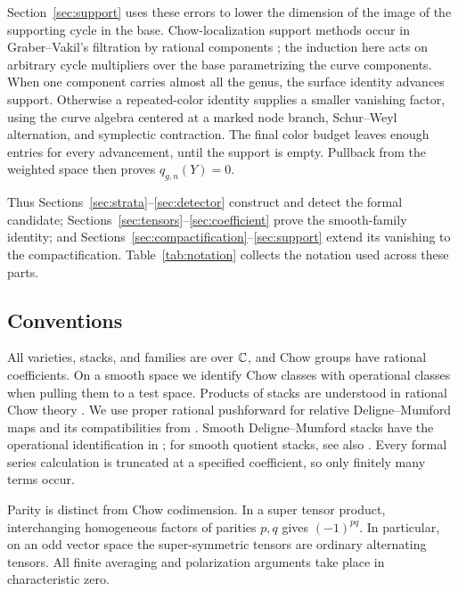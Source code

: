 Section~\ref{sec:support} uses these errors to lower the dimension of
the image of the supporting cycle in the base. Chow-localization
support methods occur in Graber--Vakil's filtration by rational
components \cite[Theorem~1.1 and Section~4.2]{GraberVakil}; the induction
here acts on arbitrary cycle multipliers over the base parametrizing
the curve components.
When one component carries almost all the genus, the surface identity
advances support. Otherwise a repeated-color identity supplies a
smaller vanishing factor, using the curve algebra centered at a marked
node branch,
Schur--Weyl alternation, and symplectic contraction. The final color
budget leaves enough entries for every advancement, until the support
is empty. Pullback from the weighted space then proves \(q_{g,n}(Y)=0\).

Thus Sections~\ref{sec:strata}--\ref{sec:detector} construct and detect
the formal candidate; Sections~\ref{sec:tensors}--\ref{sec:coefficient}
prove the smooth-family identity; and
Sections~\ref{sec:compactification}--\ref{sec:support} extend its
vanishing to the compactification. Table~\ref{tab:notation} collects
the notation used across these parts.



\subsection{Conventions}

All varieties, stacks, and families are over \(\mathbb C\), and Chow groups
have rational coefficients. On a smooth space we identify Chow classes
with operational classes when pulling them to a test space.
Products of stacks are understood in rational Chow theory
\cite[Theorem~2.1.12]{Kresch}.
We use proper rational pushforward for relative Deligne--Mumford maps
and its compatibilities from \cite[Theorem~B.17 and
Propositions~B.18--B.19]{BaeSchmitt}. Smooth Deligne--Mumford stacks have
the operational identification in \cite[Theorem~C.6 and
Corollary~C.9]{BaeSchmitt}; for smooth quotient stacks, see also
\cite[Propositions~4 and~19]{EdidinGraham}.
Every formal series calculation is
truncated at a specified coefficient, so only finitely many terms occur.

Parity is distinct from Chow codimension. In a super tensor product,
interchanging homogeneous factors of parities \(p,q\) gives
\((-1)^{pq}\). In particular, on an odd vector space the
super-symmetric tensors are ordinary alternating tensors.
All finite averaging and polarization arguments take place in
characteristic zero.


